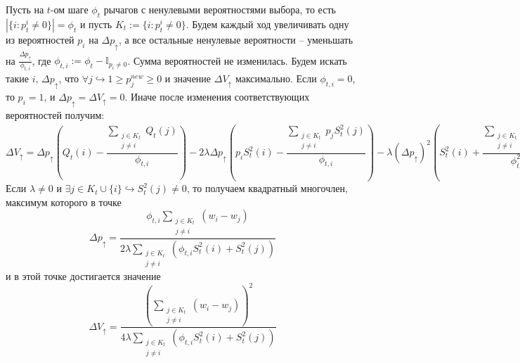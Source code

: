 \documentclass{article}
\begin{document}
\begin{enumerate}
    Пусть на $t$-ом шаге $\phi_t$ рычагов с ненулевыми вероятностями выбора, то есть $|\{i: p_t^i \neq 0\}| = \phi_t$ и пусть $K_t := \{i: p_t^i \neq 0\}$. Будем каждый ход увеличивать одну из вероятностей $p_i$ на $\Delta p_{\uparrow}$, а все остальные ненулевые вероятности -- уменьшать на $\frac{\Delta p_{\uparrow}}{\phi_{t,i}}$, где $\phi_{t,i} := \phi_t - \mathbb{I}_{p_i \neq 0}$. Сумма вероятностей не изменилась. Будем искать такие $i, \, \Delta p_{\uparrow}$, что $\forall j \hookrightarrow 1 \geq p_j^{new} \geq 0$ и значение $\Delta V_{\uparrow}$ максимально. Если $\phi_{t,i} = 0$, то $p_i = 1$, и $\Delta p_{\uparrow} = \Delta V_{\uparrow} = 0$. Иначе после изменения соответствующих вероятностей получим:
    \begin{dmath}
        \Delta V_{\uparrow} = \Delta p_{\uparrow} \left(Q_t(i) - \frac{\sum_{\substack{j \in K_t \\ j \neq i}} Q_t(j)}{\phi_{t,i}} \right) - 2\lambda \Delta p_{\uparrow} \left( p_i S_t^2(i) - \frac{\sum_{\substack{j \in K_t \\ j \neq i}} p_j S_t^2(j)}{\phi_{t,i}} \right) - \lambda (\Delta p_{\uparrow})^2 \left( S_t^2(i) + \frac{\sum_{\substack{j \in K_t \\ j \neq i}} S_t^2(j)}{\phi_{t,i}^2} \right) = \Delta p_{\uparrow} \left( w_i - \frac{\sum_{\substack{j \in K_t \\ j \neq i}} w_j}{\phi_{t,i}} \right) - \lambda (\Delta p_{\uparrow})^2 \left( S_t^2(i) + \frac{\sum_{\substack{j \in K_t \\ j \neq i}} S_t^2(j)}{\phi_{t,i}^2} \right) = \Delta p_{\uparrow} \frac{\sum_{\substack{j \in K_t \\ j \neq i}} (w_i - w_j)}{\phi_{t,i}} - \lambda (\Delta p_{\uparrow})^2 \frac{\sum_{\substack{j \in K_t \\ j \neq i}} (\phi_{t,i} S_t^2(i) + S_t^2(j))}{\phi_{t,i}^2}
        \label{eq:3}
    \end{dmath}
    Если $\lambda \neq 0$ и $\exists j \in K_t \cup \{i\} \hookrightarrow S_t^2(j) \neq 0$, то получаем квадратный многочлен, максимум которого в точке
    $$\Delta p_{\uparrow} = \frac{\phi_{t,i} \sum_{\substack{j \in K_t \\ j \neq i}} (w_i - w_j)}{2\lambda \sum_{\substack{j \in K_t \\ j \neq i}} ( \phi_{t,i} S_t^2(i) + S_t^2(j) )}$$
    и в этой точке достигается значение
    $$ \Delta V_{\uparrow} = \frac{\left( \sum_{\substack{j \in K_t \\ j \neq i}} (w_i - w_j) \right)^2}{4\lambda \sum_{\substack{j \in K_t \\ j \neq i}} ( \phi_{t,i} S_t^2(i) + S_t^2(j) )}
$$
\end{enumerate}
\end{document}
